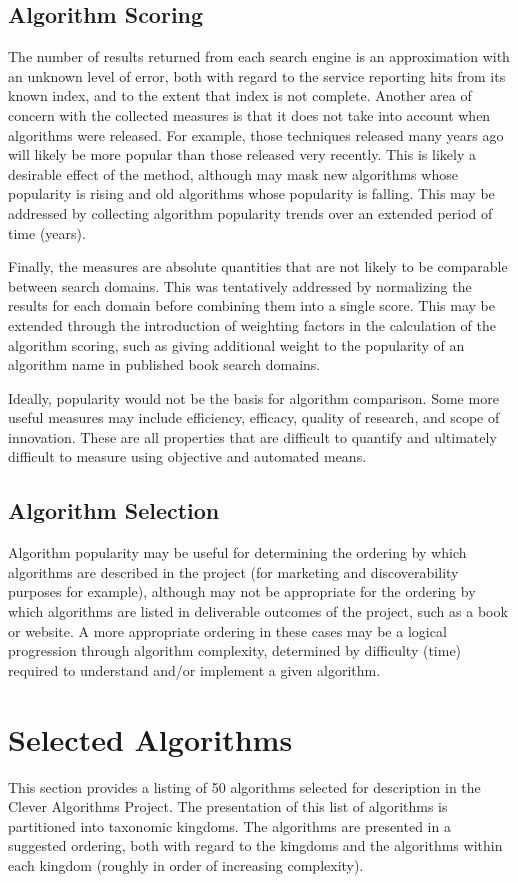 \documentclass[a4paper, 11pt]{article}
\begin{document}
\subsection{Algorithm Scoring}
The number of results returned from each search engine is an approximation with an unknown level of error, both with regard to the service reporting hits from its known index, and to the extent that index is not complete. Another area of concern with the collected measures is that it does not take into account when algorithms were released. For example, those techniques released many years ago will likely be more popular than those released very recently. This is likely a desirable effect of the method, although may mask new algorithms whose popularity is rising and old algorithms whose popularity is falling. This may be addressed by collecting algorithm popularity trends over an extended period of time (years).

Finally, the measures are absolute quantities that are not likely to be comparable between search domains. This was tentatively addressed by normalizing the results for each domain before combining them into a single score. This may be extended through the introduction of weighting factors in the calculation of the algorithm scoring, such as giving additional weight to the popularity of an algorithm name in published book search domains.

Ideally, popularity would not be the basis for algorithm comparison. Some more useful measures may include efficiency, efficacy, quality of research, and scope of innovation. These are all properties that are difficult to quantify and ultimately difficult to measure using objective and automated means.  

\subsection{Algorithm Selection}
Algorithm popularity may be useful for determining the ordering by which algorithms are described in the project (for marketing and discoverability purposes for example), although may not be appropriate for the ordering by which algorithms are listed in deliverable outcomes of the project, such as a book or website. A more appropriate ordering in these cases may be a logical progression through algorithm complexity, determined by difficulty (time) required to understand and/or implement a given algorithm.  

% 
% 
\section{Selected Algorithms}
\label{sec:selection}
This section provides a listing of 50 algorithms selected for description in the Clever Algorithms Project. The presentation of this list of algorithms is partitioned into taxonomic kingdoms. The algorithms are presented in a suggested ordering, both with regard to the kingdoms and the algorithms within each kingdom (roughly in order of increasing complexity). 
\end{document}
